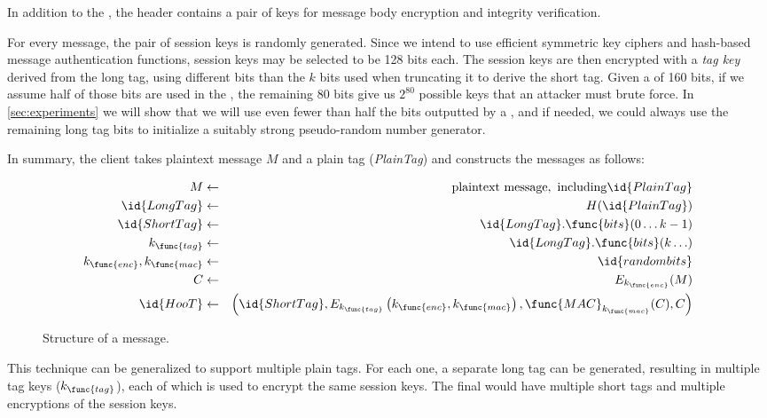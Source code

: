 %
In addition to the , the header contains a pair of keys
for message body encryption and integrity verification.

For every message, the pair of session keys is randomly generated. Since we intend
to use efficient symmetric key ciphers and hash-based message authentication
functions, session keys may be selected to be 128 bits each. The session keys
are then encrypted with a {\em tag key} derived from the long tag, using
different bits than the $k$ bits used when truncating it to derive the
short tag. Given a  of 160 bits, if we assume half of those bits
are used in the , the remaining 80 bits give
us $2^{80}$ possible keys that an attacker must brute force. In \ref{sec:experiments}
we will show that we will use even fewer than half the bits outputted by a , and if
needed, we could always use the remaining long tag bits
to initialize a suitably strong pseudo-random number generator.

In summary, the \hoot client takes plaintext message $M$ and a plain tag
({\em PlainTag}) and constructs the \hoot messages as follows:
%

\begin{figure}
\begin{eqnarray*}
M & \leftarrow & \mathrm{plaintext\ message,\ including} \id{PlainTag}
\\
\id{LongTag} & \leftarrow & H(\id{PlainTag}) \\
\id{ShortTag} & \leftarrow & \id{LongTag}.\func{bits}(0 \ldots k-1) \\
k_{\func{tag}} & \leftarrow & \id{LongTag}.\func{bits}(k \ldots) \\
k_{\func{enc}}, k_{\func{mac}} & \leftarrow & \id{random bits} \\
C & \leftarrow & E_{k_{\func{enc}}}(M) \\
\id{HooT}  & \leftarrow &  \left(\id{ShortTag}, E_{k_{\func{tag}}}\left(k_{\func{enc}}, k_{\func{mac}}\right), \func{MAC}_{k_{\func{mac}}}(C), C\right)
\end{eqnarray*}
\caption{Structure of a \hoot message.\label{fig:hoot-structure}}
\end{figure}
%
This technique can be generalized to support multiple plain tags. For
each one, a separate long tag can be generated, resulting in multiple
tag keys ($k_{\func{tag}}$), each of which is used to encrypt the same
session keys. The final \hoot would have multiple short tags and multiple
encryptions of the session keys.

